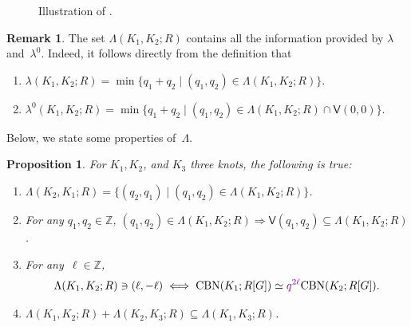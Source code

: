 \documentclass[11pt,a4paper,twoside]{amsart}
\let\cref\Cref
\newtheorem{proposition}[theorem]{Proposition}
\theoremstyle{definition}
\newtheorem{remark}[theorem]{Remark}
\def\lambda{λ}%
\newcommand{\lambdau}{\lambda^0}
\newcommand{\BNr}{{\operatorname{CBN}}}%
\newcommand{\Z}{\mathbb{Z}}
\newcommand{\QGrad}[1]{{\textcolor{violet}{#1}}}
\begin{document}
\begin{figure}[hb]
	\caption{Illustration of \cref{def:V}.}
	\label{fig:Lambda_dummy}
\end{figure}

\begin{remark}\label{rem:lambda_from_Lambda}
    The set $\Lambda(K_1,K_2;R)$ contains all the information provided by $\lambda$ and~$\lambdau$. Indeed, it follows directly from the definition that
    \begin{enumerate}[label=(\roman*)]
        \item \label{item:rem:lambda_from_Lambda:lambda}
        \(
		\lambda(K_1,K_2;R)
		=
		\min\{q_1+q_2\mid (q_1,q_2)\in\Lambda(K_1,K_2;R)\}
		\).
        \item \label{item:rem:lambda_from_Lambda:lambda-}
		\(
		\lambdau(K_1,K_2;R)
		=
		\min\{q_1+q_2\mid (q_1,q_2)\in\Lambda(K_1,K_2;R)\cap\mathsf{V}(0,0)\}
		\).
    \end{enumerate}
\end{remark}

Below, we state some properties of~$\Lambda$.

\begin{proposition}\label{prop:Lambda-basic-properties}
	For \(K_1,K_2\), and \(K_3\) three knots, the following is true:
	\begin{enumerate}[label=(\roman*)]
	\item \label{item:Lambda-basic-properties:1}
		\(
		\Lambda(K_2,K_1;R)
		=
		\{(q_2,q_1)\mid (q_1,q_2)\in\Lambda(K_1,K_2;R)\}
		\).
        \item \label{item:Lambda-basic-properties:2} For any \(q_1,q_2\in\Z\),
		\(
		(q_1,q_2)\in\Lambda(K_1,K_2;R)
		\Rightarrow
		\mathsf{V}(q_1,q_2)\subseteq\Lambda(K_1,K_2;R)
		\). 
        \item \label{item:Lambda-basic-properties:3} For any~\(\ell\in \Z\),
        \[
        \Lambda(K_1,K_2;R) \ni (\ell,-\ell) 
        \iff 
        \BNr(K_1;R[G]) \simeq \QGrad{q^{2\ell}}\BNr(K_2;R[G]).
        \]
        \item \label{item:Lambda-basic-properties:4}
        \(\Lambda(K_1,K_2;R) + \Lambda(K_2,K_3;R) \subseteq \Lambda(K_1,K_3;R)\).
	\end{enumerate}
\end{proposition}
\end{document}

